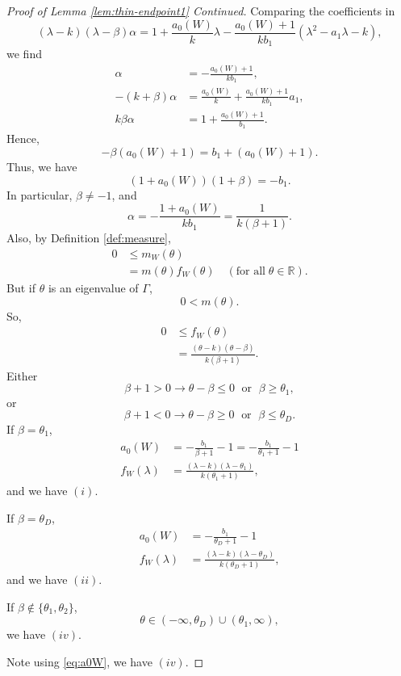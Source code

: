 \documentclass[
]{book}
\theoremstyle{definition}
\theoremstyle{definition}
\theoremstyle{definition}
\theoremstyle{definition}
\theoremstyle{remark}
\begin{document}
\begin{proof}[Proof of Lemma \ref{lem:thin-endpoint1} Continued]
Comparing the coefficients in
\[(\lambda-k)(\lambda - \beta)\alpha = 1 + \frac{a_0(W)}{k}\lambda - \frac{a_0(W)+1}{kb_1}(\lambda^2 - a_1\lambda -k),\]
we find
\begin{align}
\alpha & = -\frac{a_0(W) + 1}{kb_1},\\
-(k+\beta)\alpha & = \frac{a_0(W)}{k} + \frac{a_0(W)+1}{kb_1}a_1,\\
k\beta\alpha & = 1 + \frac{a_0(W)+1}{b_1}.
\end{align}
Hence,
\[-\beta(a_0(W) + 1) = b_1 + (a_0(W) + 1).\]
Thus, we have
\begin{equation}
(1+a_0(W))(1+\beta) = -b_1. \label{eq:a0W}
\end{equation}
In particular, \(\beta \neq -1\), and
\[\alpha = -\frac{1+a_0(W)}{kb_1} = \frac{1}{k(\beta+1)}.\]
Also, by Definition \ref{def:measure},
\begin{align}
0 &\leq m_W(\theta) \\
& = m(\theta)f_W(\theta) \quad (\text{for all} \; \theta\in \mathbb{R}).
\end{align}
But if \(\theta\) is an eigenvalue of \(\Gamma\),
\[0 < m(\theta).\]
So,
\begin{align}
0 & \leq f_W(\theta)\\
& = \frac{(\theta-k)(\theta-\beta)}{k(\beta+1)}.
\end{align}
Either
\[\beta+1 >0 \to \theta-\beta \leq 0 \;\text{ or }\; \beta \geq \theta_1,\]
or
\[\beta+1 < 0 \to \theta-\beta \geq 0 \;\text{ or }\; \beta \leq \theta_D.\]
If \(\beta = \theta_1\),
\begin{align}
a_0(W) & = - \frac{b_1}{\beta+1}-1 = -\frac{b_1}{\theta_1+1}-1\\
f_W(\lambda) & = \frac{(\lambda - k)(\lambda - \theta_1)}{k(\theta_1+1)},
\end{align}
and we have \((i)\).

If \(\beta = \theta_D\),
\begin{align}
a_0(W) & = -\frac{b_1}{\theta_D+1}-1\\
f_W(\lambda) & = \frac{(\lambda - k)(\lambda - \theta_D)}{k(\theta_D+1)},
\end{align}
and we have \((ii)\).

If \(\beta \not\in \{\theta_1, \theta_2\}\),
\[\theta \in (-\infty, \theta_D) \cup (\theta_1, \infty),\]
we have \((iv)\).

Note using \eqref{eq:a0W}, we have \((iv)\).

\end{proof}
\end{document}
